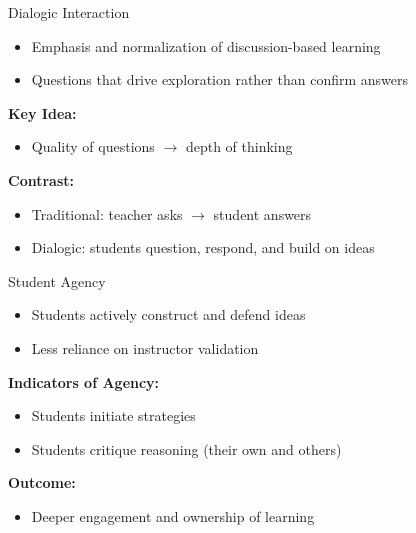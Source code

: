 \documentclass[dvipsnames]{beamer}
\begin{document}

\begin{frame}{Dialogic Interaction}
\begin{itemize}
    \item Emphasis and normalization of discussion-based learning
    \item Questions that drive exploration rather than confirm answers
\end{itemize}

\vspace{0.5cm}

\textbf{Key Idea:}
\begin{itemize}
    \item Quality of questions $\rightarrow$ depth of thinking
\end{itemize}

\vspace{0.5cm}

\textbf{Contrast:}
\begin{itemize}
    \item Traditional: teacher asks $\rightarrow$ student answers
    \item Dialogic: students question, respond, and build on ideas
\end{itemize}
\end{frame}


\begin{frame}{Student Agency}
\begin{itemize}
    \item Students actively construct and defend ideas
    \item Less reliance on instructor validation
\end{itemize}

\vspace{0.5cm}

\textbf{Indicators of Agency:}
\begin{itemize}
    \item Students initiate strategies
    \item Students critique reasoning (their own and others)
\end{itemize}

\vspace{0.5cm}

\textbf{Outcome:}
\begin{itemize}
    \item Deeper engagement and ownership of learning
\end{itemize}
\end{frame}
\end{document}

